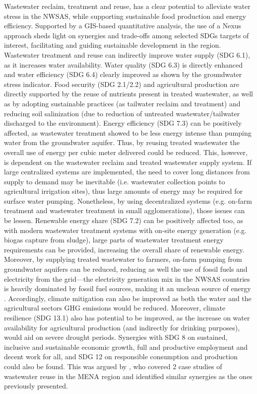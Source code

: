 Wastewater reclaim, treatment and reuse, has a clear potential to alleviate water stress in the NWSAS, while supporting sustainable food production and energy efficiency. Supported by a GIS-based quantitative analysis, the use of a Nexus approach sheds light on synergies and trade-offs among selected SDGs targets of interest, facilitating and guiding sustainable development in the region. Wastewater treatment and reuse can indirectly improve water supply (SDG 6.1), as it increases water availability. Water quality (SDG 6.3) is directly enhanced and water efficiency (SDG 6.4) clearly improved as shown by the groundwater stress indicator. Food security (SDG 2.1/2.2) and agricultural production are directly supported by the reuse of nutrients present in treated wastewater, as well as by adopting sustainable practices (as tailwater reclaim and treatment) and reducing soil salinization (due to reduction of untreated wastewater/tailwater discharged to the environment). Energy efficiency (SDG 7.3) can be positively affected, as wastewater treatment showed to be less energy intense than pumping water from the groundwater aquifer. Thus, by reusing treated wastewater the overall use of energy per cubic meter delivered could be reduced. This, however, is dependent on the wastewater reclaim and treated wastewater supply system. If large centralized systems are implemented, the need to cover long distances from supply to demand may be inevitable (i.e. wastewater collection points to agricultural irrigation sites), thus large amounts of energy may be required for surface water pumping. Nonetheless, by using decentralized systems (e.g. on-farm treatment and wastewater treatment in small agglomerations), those issues can be lessen. Renewable energy share (SDG 7.2) can be positively affected too, as with modern wastewater treatment systems with on-site energy generation (e.g. biogas capture from sludge), large parts of wastewater treatment energy requirements can be provided, increasing the overall share of renewable energy. Moreover, by supplying treated wastewater to farmers, on-farm pumping from groundwater aquifers can be reduced, reducing as well the use of fossil fuels and electricity from the grid---the electricity generation mix in the NWSAS countries is heavily dominated by fossil fuel sources, making it an unclean source of energy \cite{AlgeriaElectricityHeat2016,LibyaElectricityHeat2016,TunisiaElectricityHeat2016}. Accordingly, climate mitigation can also be improved as both the water and the agricultural sectors GHG emissions would be reduced. Moreover, climate resilience (SDG 13.1) also has potential to be improved, as the increase on water availability for agricultural production (and indirectly for drinking purposes), would aid on severe drought periods. Synergies with SDG 8 on sustained, inclusive and sustainable economic growth, full and productive employment and decent work for all, and SDG 12 on responsible consumption and production could also be found. This was argued by \citet{hoffNexusApproachMENA2019}, who covered 2 case studies of wastewater reuse in the MENA region and identified similar synergies as the ones previously presented.

